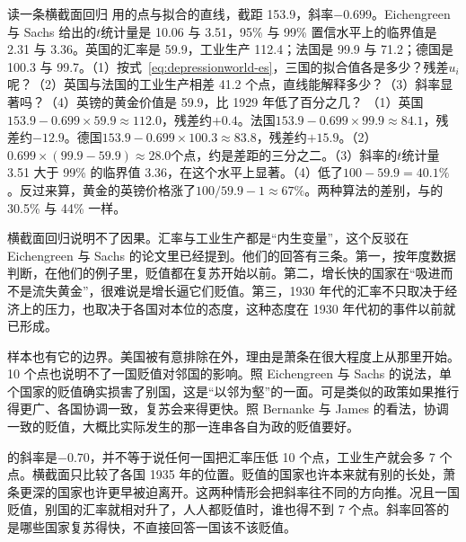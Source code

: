 \begin{example}{读一条横截面回归}\label{ex:depressionworld-es}
用的点与拟合的直线，截距 153.9，斜率$-0.699$。Eichengreen 与 Sachs 给出的$t$统计量是 10.06 与 3.51，95\% 与 99\% 置信水平上的临界值是 2.31 与 3.36\cite{eichengreen1984}。英国的汇率是 59.9，工业生产 112.4；法国是 99.9 与 71.2；德国是 100.3 与 99.7。（1）按式~\eqref{eq:depressionworld-es}，三国的拟合值各是多少？残差$u_i$呢？（2）英国与法国的工业生产相差 41.2 个点，直线能解释多少？（3）斜率显著吗？（4）英镑的黄金价值是 59.9，比 1929 年低了百分之几？
\solution （1）英国$153.9-0.699\times59.9\approx112.0$，残差约$+0.4$。法国$153.9-0.699\times99.9\approx84.1$，残差约$-12.9$。德国$153.9-0.699\times100.3\approx83.8$，残差约$+15.9$。（2）$0.699\times(99.9-59.9)\approx28.0$个点，约是差距的三分之二。（3）斜率的$t$统计量 3.51 大于 99\% 的临界值 3.36，在这个水平上显著。（4）低了$100-59.9=40.1\%$。反过来算，黄金的英镑价格涨了$100/59.9-1\approx67\%$。两种算法的差别，与的 30.5\% 与 44\% 一样。
\end{example}

横截面回归说明不了因果。汇率与工业生产都是“内生变量”，这个反驳在 Eichengreen 与 Sachs 的论文里已经提到\cite{eichengreen1984}。他们的回答有三条。第一，按年度数据判断，在他们的例子里，贬值都在复苏开始以前\cite{eichengreen1984}。第二，增长快的国家在“吸进而不是流失黄金”，很难说是增长逼它们贬值\cite{eichengreen1984}。第三，1930 年代的汇率不只取决于经济上的压力，也取决于各国对本位的态度，这种态度在 1930 年代初的事件以前就已形成\cite{eichengreen1984}。

样本也有它的边界。美国被有意排除在外，理由是萧条在很大程度上从那里开始\cite{eichengreen1984}。10 个点也说明不了一国贬值对邻国的影响。照 Eichengreen 与 Sachs 的说法，单个国家的贬值确实损害了别国，这是“以邻为壑”的一面\cite{eichengreen1984}。可是类似的政策如果推行得更广、各国协调一致，复苏会来得更快\cite{eichengreen1984}。照 Bernanke 与 James 的看法，协调一致的贬值，大概比实际发生的那一连串各自为政的贬值要好\cite{bernanke1991}。

\begin{pitfall}[斜率就是贬值的效果]
的斜率是$-0.70$，并不等于说任何一国把汇率压低 10 个点，工业生产就会多 7 个点。横截面只比较了各国 1935 年的位置。贬值的国家也许本来就有别的长处，萧条更深的国家也许更早被迫离开。这两种情形会把斜率往不同的方向推。况且一国贬值，别国的汇率就相对升了，人人都贬值时，谁也得不到 7 个点。斜率回答的是哪些国家复苏得快，不直接回答一国该不该贬值。
\end{pitfall}

